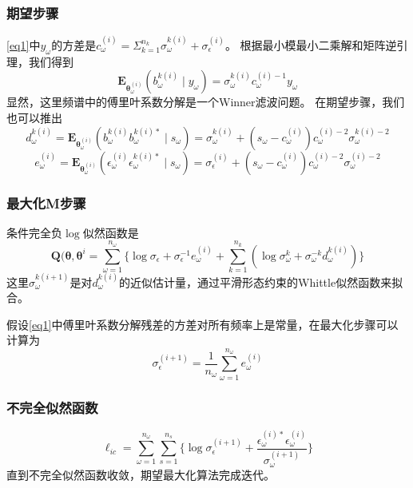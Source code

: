 \subsubsection{期望步骤}
\eqref{eq1}中$y_\omega$的方差是$c_\omega^(i)=\Sigma_{k=1}^{n_k}\sigma_\omega^{k(i)}+\sigma_\epsilon^{(i)}$。 根据最小模最小二乘解和矩阵逆引理，我们得到
\begin{equation}\label{eq5}
\mathbf{E}_{\mathbf{\theta}_\omega^{(i)}}(b_\omega^{k(i)}\mid{y}_\omega)=\sigma_\omega^{k(i)}c_\omega^{(i)-1}y_\omega
\end{equation}
显然，这里频谱中的傅里叶系数分解是一个Winner滤波问题。
在期望步骤，我们也可以推出
\begin{equation}\label{eq6}
d_\omega^{k(i)}=\mathbf{E}_{\mathbf{\theta}_\omega^{(i)}}(b_\omega^{k(i)}b_\omega^{k(i)*}\mid{s}_\omega)=\sigma_\omega^{k(i)}+(s_\omega-c_\omega^(i))c_\omega^{(i)-2}\sigma_\omega^{k(i)-2}
\end{equation}
\begin{equation}\label{eq7}
e_\omega^{(i)}=\mathbf{E}_{\mathbf{\theta}_\omega^{(i)}}(\epsilon_\omega^{(i)}\epsilon_\omega^{k(i)*}\mid{s}_\omega)=\sigma_\epsilon^{(i)}+(s_\omega-c_\omega^(i))c_\omega^{(i)-2}\sigma_\omega^{(i)-2}
\end{equation}

\subsubsection{最大化M步骤}
条件完全负$\log$似然函数是
\begin{equation}\label{eq8}
\mathbf{Q}(\mathbf{\theta},\mathbf{\theta}^{i}=\sum_{\omega=1}^{n_\omega}\lbrace\log{\sigma_\epsilon}+\sigma_\epsilon^{-1}e_\omega^{(i)}+\sum_{k=1}^{n_k}(\log{\sigma}_\omega^k+\sigma_\omega^{-k}d_\omega^{k(i)})\rbrace
\end{equation}
这里$\sigma_\omega^{k(i+1)}$是对$d_\omega^{k(i)}$的近似估计量，通过平滑形态约束的Whittle似然函数来拟合。

假设\eqref{eq1}中傅里叶系数分解残差的方差对所有频率上是常量，在最大化步骤可以计算为
\begin{equation}\label{eq9}
\sigma_\epsilon^{(i+1)}=\frac{1}{n_\omega}\sum_{\omega=1}^{n_\omega}e_\omega^{(i)}
\end{equation}

\subsubsection{不完全似然函数}
\begin{equation}\label{eq10}
\ell_{ic}=\sum_{\omega=1}^{n_\omega}\sum_{s=1}^{n_s}\lbrace\log{\sigma_\epsilon^{(i+1)}}+\frac{\epsilon_\omega^{(i)*}\epsilon_\omega^{(i)}}{\sigma_\omega^{(i+1)}}\rbrace
\end{equation}
直到不完全似然函数收敛，期望最大化算法完成迭代。

